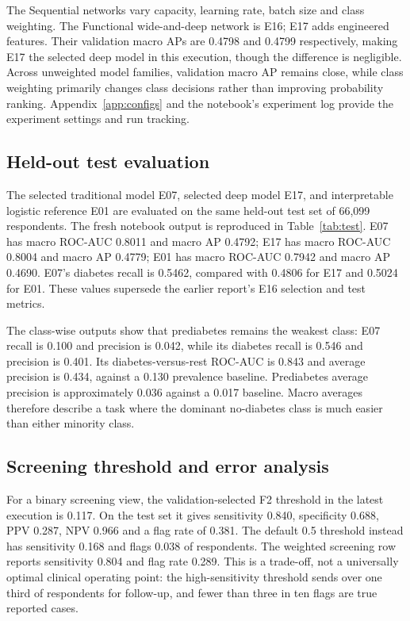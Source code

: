 The Sequential networks vary capacity, learning rate, batch size and class weighting. The Functional wide-and-deep network is E16; E17 adds engineered features. Their validation macro APs are 0.4798 and 0.4799 respectively, making E17 the selected deep model in this execution, though the difference is negligible. Across unweighted model families, validation macro AP remains close, while class weighting primarily changes class decisions rather than improving probability ranking. Appendix~\ref{app:configs} and the notebook's experiment log provide the experiment settings and run tracking.

\subsection{Held-out test evaluation}
The selected traditional model E07, selected deep model E17, and interpretable logistic reference E01 are evaluated on the same held-out test set of 66,099 respondents. The fresh notebook output is reproduced in Table~\ref{tab:test}. E07 has macro ROC-AUC 0.8011 and macro AP 0.4792; E17 has macro ROC-AUC 0.8004 and macro AP 0.4779; E01 has macro ROC-AUC 0.7942 and macro AP 0.4690. E07's diabetes recall is 0.5462, compared with 0.4806 for E17 and 0.5024 for E01. These values supersede the earlier report's E16 selection and test metrics.



The class-wise outputs show that prediabetes remains the weakest class: E07 recall is 0.100 and precision is 0.042, while its diabetes recall is 0.546 and precision is 0.401. Its diabetes-versus-rest ROC-AUC is 0.843 and average precision is 0.434, against a 0.130 prevalence baseline. Prediabetes average precision is approximately 0.036 against a 0.017 baseline. Macro averages therefore describe a task where the dominant no-diabetes class is much easier than either minority class.

\subsection{Screening threshold and error analysis}
For a binary screening view, the validation-selected F2 threshold in the latest execution is 0.117. On the test set it gives sensitivity 0.840, specificity 0.688, PPV 0.287, NPV 0.966 and a flag rate of 0.381. The default 0.5 threshold instead has sensitivity 0.168 and flags 0.038 of respondents. The weighted screening row reports sensitivity 0.804 and flag rate 0.289. This is a trade-off, not a universally optimal clinical operating point: the high-sensitivity threshold sends over one third of respondents for follow-up, and fewer than three in ten flags are true reported cases.

